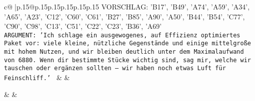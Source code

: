 \documentclass{article}
\begin{document}
{\begin{supertabular}{c@{$\;$}|p{.15\linewidth}@{}p{.15\linewidth}p{.15\linewidth}p{.15\linewidth}p{.15\linewidth}p{.15\linewidth}}
{{{VORSCHLAG: {'B17', 'B49', 'A74', 'A59', 'A34', 'A65', 'A23', 'C12', 'C60', 'C61', 'B27', 'B85', 'A90', 'A50', 'B44', 'B54', 'C77', 'C90', 'C98', 'C13', 'C51', 'C22', 'C23', 'B36', 'A69'}\\ \tt ARGUMENT: {'Ich schlage ein ausgewogenes, auf Effizienz optimiertes Paket vor: viele kleine, nützliche Gegenstände und einige mittelgroße mit hohem Nutzen, und wir bleiben deutlich unter dem Maximalaufwand von 6880. Wenn dir bestimmte Stücke wichtig sind, sag mir, welche wir tauschen oder ergänzen sollten – wir haben noch etwas Luft für Feinschliff.'} 
	  } 
	   } 
	   } 
	 & & \\ 
 

    \theutterance {}  

    & & 
\end{supertabular}}
\end{document}
